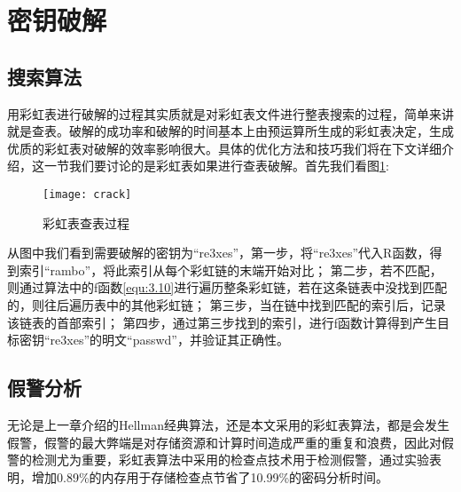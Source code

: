 \section{密钥破解}
\subsection{搜索算法}
用彩虹表进行破解的过程其实质就是对彩虹表文件进行整表搜索的过程，简单来讲就是查表。破解的成功率和破解的时间基本上由预运算所生成的彩虹表决定，生成优质的彩虹表对破解的效率影响很大。具体的优化方法和技巧我们将在下文详细介绍，这一节我们要讨论的是彩虹表如果进行查表破解。首先我们看图\ref{fig:4.3}:
\begin{figure}[!ht]
\centering
\texttt{[image: crack]}
\caption{彩虹表查表过程}
\label{fig:4.3}
\end{figure}

从图中我们看到需要破解的密钥为“re3xes”，第一步，将“re3xes”代入R函数，得到索引“rambo”，将此索引从每个彩虹链的末端开始对比；
第二步，若不匹配，则通过算法中的f函数\eqref{equ:3.10}进行遍历整条彩虹链，若在这条链表中没找到匹配的，则往后遍历表中的其他彩虹链；
第三步，当在链中找到匹配的索引后，记录该链表的首部索引；
第四步，通过第三步找到的索引，进行f函数计算得到产生目标密钥“re3xes”的明文“passwd”，并验证其正确性。
\subsection{假警分析}
无论是上一章介绍的Hellman经典算法，还是本文采用的彩虹表算法，都是会发生假警，假警的最大弊端是对存储资源和计算时间造成严重的重复和浪费，因此对假警的检测尤为重要，彩虹表算法中采用的检查点技术用于检测假警，通过实验表明，增加0.89\%的内存用于存储检查点节省了10.99\%的密码分析时间。
